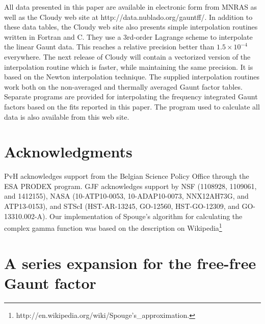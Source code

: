 \documentclass[useAMS,usenatbib]{mn2e}
\begin{document}
All data presented in this paper are available in electronic form from MNRAS
as well as the Cloudy web site at http://data.nublado.org/gauntff/. In
addition to these data tables, the Cloudy web site also presents simple
interpolation routines written in Fortran and C. They use a 3rd-order Lagrange
scheme to interpolate the linear Gaunt data. This reaches a relative precision
better than $1.5\times10^{-4}$ everywhere. The next release of Cloudy will
contain a vectorized version of the interpolation routine which is faster,
while maintaining the same precision. It is based on the Newton interpolation
technique. The supplied interpolation routines work both on the non-averaged
and thermally averaged Gaunt factor tables. Separate programs are provided for
interpolating the frequency integrated Gaunt factors based on the fits
reported in this paper. The program used to calculate all data is also
available from this web site.

\section*{Acknowledgments}

PvH acknowledges support from the Belgian Science Policy Office through the
ESA PRODEX program. GJF acknowledges support by NSF (1108928, 1109061, and
1412155), NASA (10-ATP10-0053, 10-ADAP10-0073, NNX12AH73G, and ATP13-0153),
and STScI (HST-AR-13245, GO-12560, HST-GO-12309, and GO-13310.002-A). Our
implementation of Spouge's algorithm for calculating the complex gamma
function was based on the description on
Wikipedia\footnote{http://en.wikipedia.org/wiki/Spouge's\_approximation.}




\onecolumn

\appendix
\section{A series expansion for the free-free Gaunt factor}
\label{series}
\end{document}
